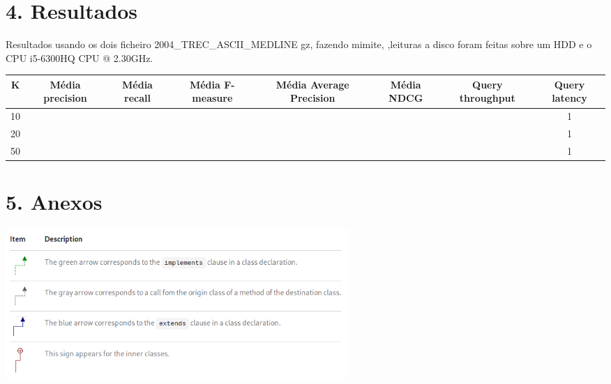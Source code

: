 \documentclass[12pt]{article}
\begin{document}
\newpage

\section*{4. Resultados}

Resultados usando os dois ficheiro 2004\_TREC\_ASCII\_MEDLINE gz,
fazendo mimite, ,leituras a disco foram feitas sobre
um HDD e o CPU i5-6300HQ CPU @ 2.30GHz.

{
\tiny
\begin{tabular}{| c | c | c | c | c | c | c | c |}
        \hline K
        & \bf  Média precision
        & \bf  Média recall
        & \bf  Média F-measure
        & \bf  Média Average Precision
        & \bf  Média NDCG
        & \bf  Query throughput
        & \bf  Query latency \\

        \hline 10
        &
        &
        &
        &
        &
        &
        & 1 \\

        \hline 20
        &
        &
        &
        &
        &
        &
        & 1 \\

        \hline 50
        &
        &
        &
        &
        &
        &
        & 1 \\
        \hline

\end{tabular}
}

\newpage

\section*{5. Anexos}

\includegraphics[width=13cm]{arrow_legend.png}
\end{document}
